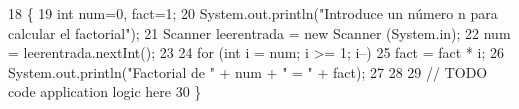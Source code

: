 \begin{DoxyCode}
18                                            \{
19         \textcolor{keywordtype}{int} num=0, fact=1;
20         System.out.println(\textcolor{stringliteral}{"Introduce un número n para calcular el factorial"});
21         Scanner leerentrada = \textcolor{keyword}{new} Scanner (System.in);
22             num = leerentrada.nextInt();
23             
24             \textcolor{keywordflow}{for} (\textcolor{keywordtype}{int} i = num; i >= 1; i--)
25                 fact = fact * i;
26             System.out.println(\textcolor{stringliteral}{"Factorial de "} + num + \textcolor{stringliteral}{" = "} + fact);
27             
28                     
29         \textcolor{comment}{// TODO code application logic here}
30     \}   
\end{DoxyCode}
